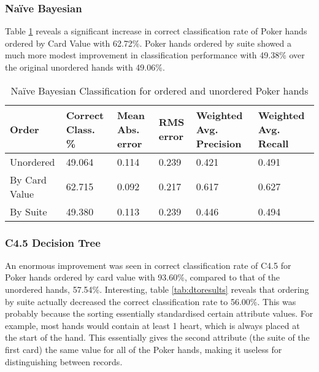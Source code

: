 \documentclass[10pt, a4paper]{article}
\begin{document}
\subsubsection*{Na\"ive Bayesian}

Table \ref{tab:nboresults} reveals a significant increase in correct classification rate of Poker hands ordered by Card Value with 62.72\%. Poker hands ordered by suite showed a much more modest improvement in classification performance with 49.38\% over the original unordered hands with 49.06\%.

\begin{table}[htbp]
  \centering  
    \begin{tabular}{p{3cm}p{1.5cm}p{1.5cm}p{1.5cm}p{1.5cm}p{1.5cm}}
    \toprule
    \textbf{Order} & Correct Class. \% & Mean Abs. error & RMS error & Weighted Avg. Precision & Weighted Avg. Recall \\
    \midrule
    Unordered & 49.064 & 0.114 & 0.239 & 0.421 & 0.491 \\
    By Card Value & 62.715 & 0.092 & 0.217 & 0.617 & 0.627 \\
    By Suite & 49.380 & 0.113 & 0.239 & 0.446 & 0.494 \\
    \bottomrule
    \end{tabular}%
  \caption{Na\"ive Bayesian Classification for ordered and unordered Poker hands}
  \label{tab:nboresults}%
\end{table}%

\subsubsection*{C4.5 Decision Tree}

An enormous improvement was seen in correct classification rate of C4.5 for Poker hands ordered by card value with 93.60\%, compared to that of the unordered hands, 57.54\%. Interesting, table \ref{tab:dtoresults} reveals that ordering by suite actually decreased the correct classification rate to 56.00\%. This was probably because the sorting essentially standardised certain attribute values. For example, most hands would contain at least 1 heart, which is always placed at the start of the hand. This essentially gives the second attribute (the suite of the first card) the same value for all of the Poker hands, making it useless for distinguishing between records.
\end{document}

